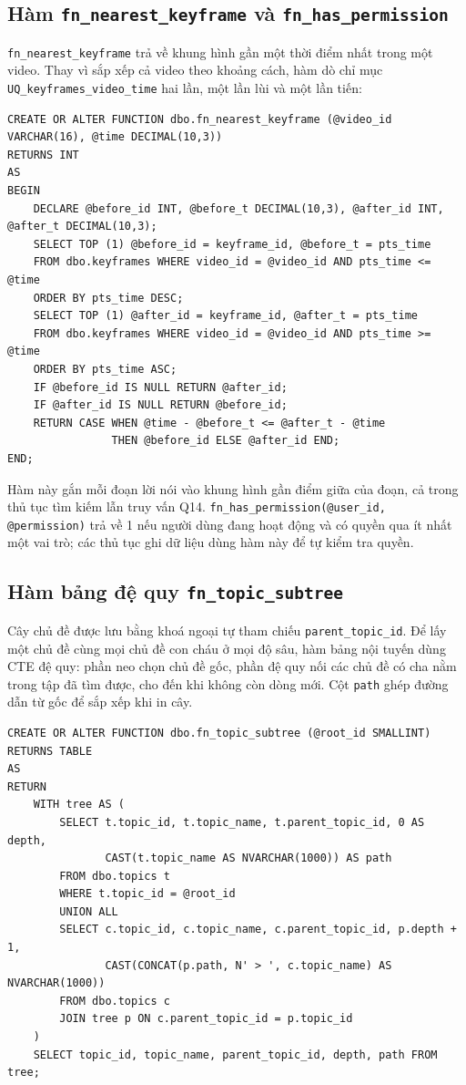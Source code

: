 \subsection{Hàm \texttt{fn\_nearest\_keyframe} và \texttt{fn\_has\_permission}}

\texttt{fn\_nearest\_keyframe} trả về khung hình gần một thời điểm nhất trong một video.
Thay vì sắp xếp cả video theo khoảng cách, hàm dò chỉ mục
\texttt{UQ\_keyframes\_video\_time} hai lần, một lần lùi và một lần tiến:

\begin{lstlisting}[caption={Hàm fn\_nearest\_keyframe}, label={lst:nearest}]
CREATE OR ALTER FUNCTION dbo.fn_nearest_keyframe (@video_id VARCHAR(16), @time DECIMAL(10,3))
RETURNS INT
AS
BEGIN
    DECLARE @before_id INT, @before_t DECIMAL(10,3), @after_id INT, @after_t DECIMAL(10,3);
    SELECT TOP (1) @before_id = keyframe_id, @before_t = pts_time
    FROM dbo.keyframes WHERE video_id = @video_id AND pts_time <= @time
    ORDER BY pts_time DESC;
    SELECT TOP (1) @after_id = keyframe_id, @after_t = pts_time
    FROM dbo.keyframes WHERE video_id = @video_id AND pts_time >= @time
    ORDER BY pts_time ASC;
    IF @before_id IS NULL RETURN @after_id;
    IF @after_id IS NULL RETURN @before_id;
    RETURN CASE WHEN @time - @before_t <= @after_t - @time
                THEN @before_id ELSE @after_id END;
END;
\end{lstlisting}

Hàm này gắn mỗi đoạn lời nói vào khung hình gần điểm giữa của đoạn, cả trong thủ tục tìm
kiếm lẫn truy vấn Q14. \texttt{fn\_has\_permission(@user\_id, @permission)} trả về 1 nếu
người dùng đang hoạt động và có quyền qua ít nhất một vai trò; các thủ tục ghi dữ liệu
dùng hàm này để tự kiểm tra quyền.

\subsection{Hàm bảng đệ quy \texttt{fn\_topic\_subtree}}

Cây chủ đề được lưu bằng khoá ngoại tự tham chiếu \texttt{parent\_topic\_id}. Để lấy một
chủ đề cùng mọi chủ đề con cháu ở mọi độ sâu, hàm bảng nội tuyến dùng CTE đệ quy: phần neo
chọn chủ đề gốc, phần đệ quy nối các chủ đề có cha nằm trong tập đã tìm được, cho đến khi
không còn dòng mới. Cột \texttt{path} ghép đường dẫn từ gốc để sắp xếp khi in cây.

\begin{lstlisting}[caption={Hàm fn\_topic\_subtree với CTE đệ quy}, label={lst:subtree}]
CREATE OR ALTER FUNCTION dbo.fn_topic_subtree (@root_id SMALLINT)
RETURNS TABLE
AS
RETURN
    WITH tree AS (
        SELECT t.topic_id, t.topic_name, t.parent_topic_id, 0 AS depth,
               CAST(t.topic_name AS NVARCHAR(1000)) AS path
        FROM dbo.topics t
        WHERE t.topic_id = @root_id
        UNION ALL
        SELECT c.topic_id, c.topic_name, c.parent_topic_id, p.depth + 1,
               CAST(CONCAT(p.path, N' > ', c.topic_name) AS NVARCHAR(1000))
        FROM dbo.topics c
        JOIN tree p ON c.parent_topic_id = p.topic_id
    )
    SELECT topic_id, topic_name, parent_topic_id, depth, path FROM tree;
\end{lstlisting}

